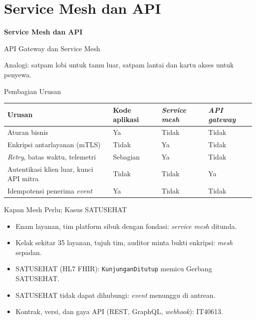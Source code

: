\documentclass[aspectratio=169, table, 12pt]{beamer}
\begin{document}
\section{Service Mesh dan API}

\begin{frame}{\hfill}
  \centering
  \Huge{\textbf{Service Mesh dan API}}
\end{frame}

\begin{frame}{{\Large API Gateway dan Service Mesh}}
  \centering

  \vspace{6pt}
  \small
  Analogi: satpam lobi untuk tamu luar, satpam lantai dan kartu akses
  untuk penyewa.
\end{frame}

\begin{frame}{{\Large Pembagian Urusan}}
  \footnotesize
  \begin{tabularx}{\textwidth}{>{\raggedright\arraybackslash}X
      >{\centering\arraybackslash}p{2.2cm} >{\centering\arraybackslash}p{2.2cm}
      >{\centering\arraybackslash}p{2.2cm}}
    \hline
    \textbf{Urusan} & \textbf{Kode aplikasi} & \textbf{\textit{Service mesh}}
      & \textbf{\textit{API gateway}} \\
    \hline
    Aturan bisnis & Ya & Tidak & Tidak \\
    \hline
    Enkripsi antarlayanan (mTLS) & Tidak & Ya & Tidak \\
    \hline
    \textit{Retry}, batas waktu, telemetri & Sebagian & Ya & Tidak \\
    \hline
    Autentikasi klien luar, kunci API mitra & Tidak & Tidak & Ya \\
    \hline
    Idempotensi penerima \textit{event} & Ya & Tidak & Tidak \\
    \hline
  \end{tabularx}
\end{frame}

\begin{frame}{{\Large Kapan Mesh Perlu; Kasus SATUSEHAT}}
  \vspace{6pt}
  \begin{itemize}
    \item Enam layanan, tim platform sibuk dengan fondasi: \textit{service mesh} ditunda.
    \item Kelak sekitar 35 layanan, tujuh tim, auditor minta bukti enkripsi:
          \textit{mesh} sepadan.
    \item SATUSEHAT (HL7 FHIR): \texttt{KunjunganDitutup} memicu Gerbang
          SATUSEHAT.
    \item SATUSEHAT tidak dapat dihubungi: \textit{event} menunggu di antrean.
    \item Kontrak, versi, dan gaya API (REST, GraphQL, \textit{webhook}):
          IT40613.
  \end{itemize}
\end{frame}
\end{document}
